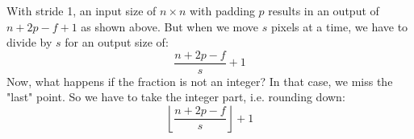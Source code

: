 \documentclass[12pt, a4paper]{article}
\numberwithin{equation}{section}
\begin{document}
With stride 1, an input size of $n\times n$ with padding $p$ results in an output of $n+2p-f+1$ as shown above. But when we move $s$ pixels at a time, we have to divide by $s$ for an output size of:
\begin{equation}
\frac{n+2p-f}{s}+1
\end{equation}
Now, what happens if the fraction is not an integer? In that case, we miss the "last" point. So we have to take the integer part, i.e. rounding down:
\begin{equation}
\left\lfloor\frac{n+2p-f}{s}\right\rfloor+1
\end{equation}
\end{document}
